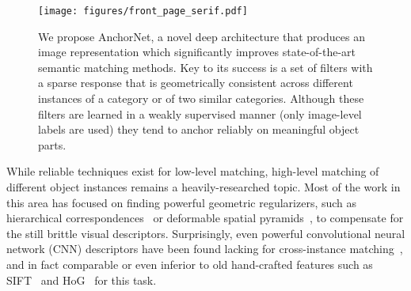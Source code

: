\documentclass[10pt,twocolumn,letterpaper]{article}
\begin{document}
\begin{figure}[t!]
  \centering
  \texttt{[image: figures/front\_page\_serif.pdf]}
  \caption{We propose AnchorNet, a novel deep architecture that produces an image representation which significantly improves state-of-the-art semantic matching methods. Key to its success is a set of filters with a sparse response that is geometrically consistent across different instances of a category or of two similar categories. Although these filters are learned in a weakly supervised manner (\ie only image-level labels are used) they tend to anchor reliably on meaningful object parts. }\label{f:splash}
\end{figure}

While reliable techniques exist for low-level matching, high-level matching of different object instances remains a heavily-researched topic. Most of the work in this area has focused on finding powerful geometric regularizers, such as hierarchical correspondences~\cite{liu08siftflow} or deformable spatial pyramids~\cite{kim2013deformable}, to compensate for the still brittle visual descriptors. Surprisingly, even powerful convolutional neural network (CNN) descriptors have been found lacking for cross-instance matching~\cite{long2014do,ham2016,zhou2016learning}, and in fact comparable or even inferior to old hand-crafted features such as SIFT~\cite{lowe2004sift} and HoG~\cite{dalal05hog} for this task.
\end{document}
